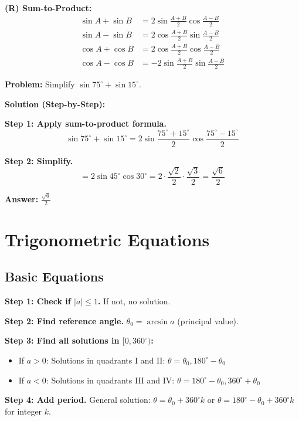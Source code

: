 \documentclass[12pt]{extarticle}
\begin{document}
\begin{theorembox}
\textbf{(R) Sum-to-Product:}
\begin{align}
\sin A + \sin B &= 2\sin\frac{A+B}{2}\cos\frac{A-B}{2} \\
\sin A - \sin B &= 2\cos\frac{A+B}{2}\sin\frac{A-B}{2} \\
\cos A + \cos B &= 2\cos\frac{A+B}{2}\cos\frac{A-B}{2} \\
\cos A - \cos B &= -2\sin\frac{A+B}{2}\sin\frac{A-B}{2}
\end{align}
\end{theorembox}

\begin{examplebox}
\textbf{Problem:} Simplify $\sin 75^\circ + \sin 15^\circ$.

\textbf{Solution (Step-by-Step):}

\textbf{Step 1: Apply sum-to-product formula.}
\[
\sin 75^\circ + \sin 15^\circ = 2\sin\frac{75^\circ + 15^\circ}{2}\cos\frac{75^\circ - 15^\circ}{2}
\]

\textbf{Step 2: Simplify.}
\[
= 2\sin 45^\circ \cos 30^\circ = 2 \cdot \frac{\sqrt{2}}{2} \cdot \frac{\sqrt{3}}{2} = \frac{\sqrt{6}}{2}
\]

\textbf{Answer:} $\boxed{\frac{\sqrt{6}}{2}}$
\end{examplebox}

\section{Trigonometric Equations}

\subsection{Basic Equations}

\begin{conceptbox}[Solving sin theta = a]
\textbf{Step 1: Check if $|a| \le 1$.} If not, no solution.

\textbf{Step 2: Find reference angle.} $\theta_0 = \arcsin a$ (principal value).

\textbf{Step 3: Find all solutions in $[0, 360^\circ)$:}
\begin{itemize}
\item If $a > 0$: Solutions in quadrants I and II: $\theta = \theta_0, 180^\circ - \theta_0$
\item If $a < 0$: Solutions in quadrants III and IV: $\theta = 180^\circ - \theta_0, 360^\circ + \theta_0$
\end{itemize}

\textbf{Step 4: Add period.} General solution: $\theta = \theta_0 + 360^\circ k$ or $\theta = 180^\circ - \theta_0 + 360^\circ k$ for integer $k$.
\end{conceptbox}
\end{document}
